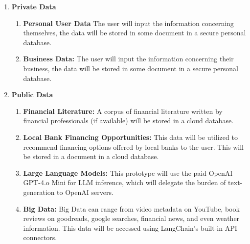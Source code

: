 \documentclass{article}
\begin{document}
\begin{enumerate}[label=(\alph*)]
    \item 
        \textbf{Private Data}
        \begin{enumerate}[label=\roman*.] %
            \item \textbf{Personal User Data} The user will input the information concerning themselves, the data will be stored in some document in a secure personal database.
            \item \textbf{Business Data:} The user will input the information concerning their business, the data will be stored in some document in a secure personal database.
        \end{enumerate}

    \item
        \textbf{Public Data}
        \begin{enumerate}[label=\roman*.] %
            \item \textbf{Financial Literature:} A corpus of financial literature written by financial professionals (if available) will be stored in a cloud database.
            \item \textbf{Local Bank Financing Opportunities:} This data will be utilized to recommend financing options offered by local banks to the user. This will be stored in a document in a cloud database.
            \item \textbf{Large Language Models:} This prototype will use the paid OpenAI GPT-4.o Mini for LLM inference, which will delegate the burden of text-generation to OpenAI servers.
            \item \textbf{Big Data:} Big Data can range from video metadata on YouTube, book reviews on goodreads, google searches, financial news, and even weather information. This data will be accessed using LangChain’s built-in API connectors.
        \end{enumerate}
\end{enumerate}
\end{document}
